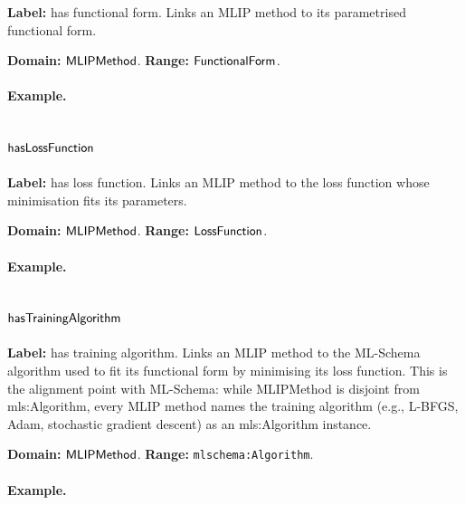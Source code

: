 \textbf{Label:} has functional form.
Links an MLIP method to its parametrised functional form.

\textbf{Domain:} $\mathsf{MLIPMethod}$.
\textbf{Range:} $\mathsf{FunctionalForm}$.

\paragraph{Example.}

\subsection{$\mathsf{hasLossFunction}$}
\label{sec:term-hasLossFunction}

\textbf{Label:} has loss function.
Links an MLIP method to the loss function whose minimisation fits its parameters.

\textbf{Domain:} $\mathsf{MLIPMethod}$.
\textbf{Range:} $\mathsf{LossFunction}$.

\paragraph{Example.}

\subsection{$\mathsf{hasTrainingAlgorithm}$}
\label{sec:term-hasTrainingAlgorithm}

\textbf{Label:} has training algorithm.
Links an MLIP method to the ML-Schema algorithm used to fit its functional form by minimising its loss function. This is the alignment point with ML-Schema: while MLIPMethod is disjoint from mls:Algorithm, every MLIP method names the training algorithm (e.g., L-BFGS, Adam, stochastic gradient descent) as an mls:Algorithm instance.

\textbf{Domain:} $\mathsf{MLIPMethod}$.
\textbf{Range:} \texttt{mlschema:Algorithm}.

\paragraph{Example.}

